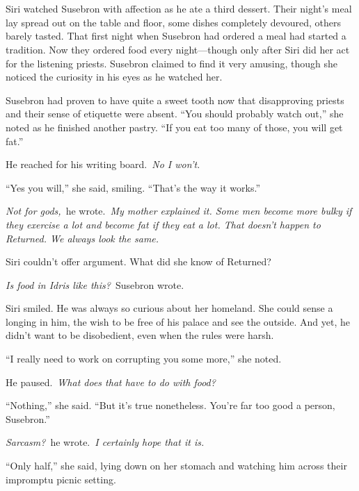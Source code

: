 \chapter{}

Siri watched Susebron with affection as he ate a third dessert. Their night’s meal lay spread out on the table and floor, some dishes completely devoured, others barely tasted. That first night when Susebron had ordered a meal had started a tradition. Now they ordered food every night—though only after Siri did her act for the listening priests. Susebron claimed to find it very amusing, though she noticed the curiosity in his eyes as he watched her.

Susebron had proven to have quite a sweet tooth now that disapproving priests and their sense of etiquette were absent. “You should probably watch out,” she noted as he finished another pastry. “If you eat too many of those, you will get fat.”

He reached for his writing board.~\textit{No I won’t.}

“Yes you will,” she said, smiling. “That’s the way it works.”

\textit{Not for gods,}~he wrote.~\textit{My mother explained it. Some men become more bulky if they exercise a lot and become fat if they eat a lot. That doesn’t happen to Returned. We always look the same.}

Siri couldn’t offer argument. What did she know of Returned?

\textit{Is food in Idris like this?}~Susebron wrote.

Siri smiled. He was always so curious about her homeland. She could sense a longing in him, the wish to be free of his palace and see the outside. And yet, he didn’t want to be disobedient, even when the rules were harsh.

“I really need to work on corrupting you some more,” she noted.

He paused.~\textit{What does that have to do with food?}

“Nothing,” she said. “But it’s true nonetheless. You’re far too good a person, Susebron.”

\textit{Sarcasm?}~he wrote.~\textit{I certainly hope that it is.}

“Only half,” she said, lying down on her stomach and watching him across their impromptu picnic setting.

